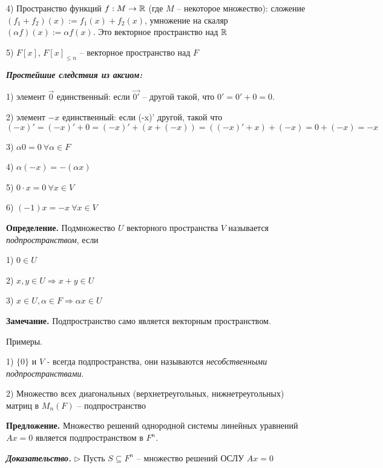 4) Пространство функций $f: M \rightarrow \mathbb{R}$ (где $M$ -- некоторое множество): сложение $(f_1 + f_2)(x) := f_1(x) + f_2(x)$, умножение на скаляр $(\alpha f)(x) := \alpha f(x)$. Это векторное пространство над $\mathbb{R}$

5) $F[x]$, $F[x]_{\leq n}$ -- векторное пространство над $F$

\vspace{\baselineskip}
\textbf{\textit{Простейшие следствия из аксиом:}}

1) элемент $\overrightarrow{0}$ единственный: если $\overrightarrow{0'}$ -- другой такой, что $0' = 0' + 0 = 0$. 

2) элемент $-x$ единственный: если (-x)' другой, такой что $(-x)' = (-x)' + 0 = (-x)' + (x + (-x)) = ((-x)' + x) + (-x) = 0 + (-x) = -x$

3) $\alpha 0 = 0 \ \forall \alpha \in F$

4) $\alpha (-x) = -(\alpha x)$

5) $0 \cdot x = 0 \ \forall x \in V$

6) $(-1)x = -x \ \forall x \in V$

\vspace{\baselineskip}
\textbf{Определение.} Подмножество $U$ векторного пространства $V$ называется \textit{подпространством}, если

1) $0 \in U$

2) $x, y \in U \Rightarrow x + y \in U$

3) $x \in U, \alpha \in F \Rightarrow \alpha x \in U$

\vspace{\baselineskip}
\textbf{Замечание.} Подпространство само является векторным пространством.

\vspace{\baselineskip}
Примеры.

1) $\{0\}$ и $V$ - всегда подпространства, они называются \textit{несобственными подпространствами}.

2) Множество всех диагональных (верхнетреугольных, нижнетреугольных) матриц в $M_n (F)$ -- подпространство

\vspace{\baselineskip}
\textbf{Предложение.} Множество решений однородной системы линейных уравнений $Ax = 0$ является подпространством в $F^n$.

\vspace{\baselineskip}
\textbf{\textit{Доказательство.}} $\rhd$ Пусть $S \subseteq F^n$ -- множество решений ОСЛУ $Ax = 0$

